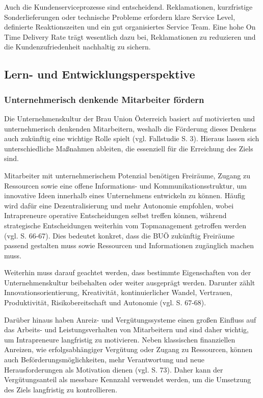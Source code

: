 Auch die Kundenserviceprozesse sind entscheidend. Reklamationen, kurzfristige Sonderlieferungen oder technische Probleme erfordern klare Service Level, definierte Reaktionszeiten und ein gut organisiertes Service Team. Eine hohe On Time Delivery Rate trägt wesentlich dazu bei, Reklamationen zu reduzieren und die Kundenzufriedenheit nachhaltig zu sichern.




\subsection{Lern- und Entwicklungsperspektive}

\subsubsection{Unternehmerisch denkende Mitarbeiter fördern}

Die Unternehmenskultur der Brau Union Österreich basiert auf motivierten und unternehmerisch denkenden Mitarbeitern, weshalb die Förderung dieses Denkens auch zukünftig eine wichtige Rolle spielt (vgl. Fallstudie S. 3). Hieraus lassen sich unterschiedliche Maßnahmen ableiten, die essenziell für die Erreichung des Ziels sind. 

Mitarbeiter mit unternehmerischem Potenzial benötigen Freiräume, Zugang zu Ressourcen sowie eine offene Informations- und Kommunikationsstruktur, um innovative Ideen innerhalb eines Unternehmens entwickeln zu können. Häufig wird dafür eine Dezentralisierung und mehr Autonomie empfohlen, wobei Intrapreneure operative Entscheidungen selbst treffen können, während strategische Entscheidungen weiterhin vom Topmanagement getroffen werden (vgl. \cite{kollinger_intrapreneurship_2023} S. 66-67). Dies bedeutet konkret, dass die BUÖ zukünftig Freiräume passend gestalten muss sowie Ressourcen und Informationen zugänglich machen muss.

Weiterhin muss darauf geachtet werden, dass bestimmte Eigenschaften von der Unternehmenskultur beibehalten oder weiter ausgeprägt werden. Darunter zählt Innovationsorientierung, Kreativität, kontinuierlicher Wandel, Vertrauen, Produktivität, Risikobereitschaft und Autonomie (vgl. \cite{kollinger_intrapreneurship_2023} S. 67-68).

Darüber hinaus haben Anreiz- und Vergütungssysteme einen großen Einfluss auf das Arbeits- und Leistungsverhalten von Mitarbeitern und sind daher wichtig, um Intrapreneure langfristig zu motivieren. Neben klassischen finanziellen Anreizen, wie erfolgsabhängiger Vergütung oder Zugang zu Ressourcen, können auch Beförderungsmöglichkeiten, mehr Verantwortung und neue Herausforderungen als Motivation dienen (vgl. \cite{kollinger_intrapreneurship_2023} S. 73). Daher kann der Vergütungsanteil als messbare Kennzahl verwendet werden, um die Umsetzung des Ziels langfristig zu kontrollieren.



